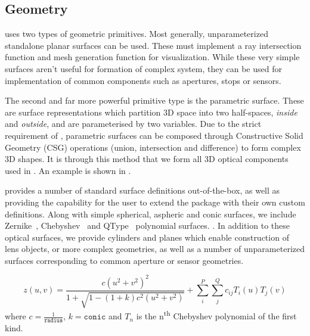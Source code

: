 \documentclass{juliacon}
\begin{document}


\subsection{Geometry}

\OpticSim{} uses two types of geometric primitives.
Most generally, unparameterized standalone planar surfaces can be used.
These must implement a ray intersection function and mesh generation function for visualization.
While these very simple surfaces aren't useful for formation of complex system, they can be used for implementation of common components such as apertures, stops or sensors.

The second and far more powerful primitive type is the parametric surface.
These are surface representations which partition 3D space into two half-spaces, \emph{inside} and \emph{outside}, and are parameterised by two variables.
Due to the strict requirement of , parametric surfaces can be composed through Constructive Solid Geometry (CSG) operations (union, intersection and difference) to form complex 3D shapes.
It is through this method that we form all 3D optical components used in \OpticSim{}.
An example is shown in .

\OpticSim{} provides a number of standard surface definitions out-of-the-box, as well as providing the capability for the user to extend the package with their own custom definitions.
Along with simple spherical, aspheric and conic surfaces, we include Zernike~, Chebyshev~ and QType~\cite{forbes2010robust,forbes2012characterizing} polynomial surfaces.
.
In addition to these optical surfaces, we provide cylinders and planes which enable construction of lens objects, or more complex geometries, as well as a number of unparameterized surfaces corresponding to common aperture or sensor geometries.

\iffalse %
$$
z(u,v) = \frac{c(u^2 + v^2)^2}{1 + \sqrt{1 - (1+k)c^2(u^2 + v^2)}} + \sum_{i}^{P}\sum_{j}^{Q}c_{ij}T_i(u)T_j(v)
$$
where $c = \frac{1}{\texttt{radius}}$, $k = \texttt{conic}$ and $T_n$ is the n\textsuperscript{th} Chebyshev polynomial of the first kind.
\end{document}
